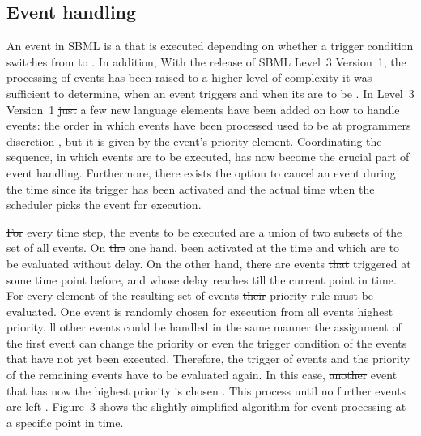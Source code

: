 \documentclass[10pt]{bmc_article}
\newenvironment{bmcformat}{\begin{raggedright}\baselineskip20pt\sloppy\setboolean{publ}{false}}{\end{raggedright}\baselineskip20pt\sloppy}
\begin{document}
\begin{bmcformat}
\subsection*{Event handling}

An event in \acs{SBML} is a  that is executed depending
on whether a trigger  condition switches from \false to \true.
In addition, 
With the release of \acs{SBML} Level~3 Version~1, the processing of events has
been raised to a higher level of complexity\COR{:}
 it was sufficient to determine, when an event triggers
and when its  are to be .
In Level~3 Version~1 \sout{just} a few new language elements have been
added on how to handle events:
 the order\COR{,} in which events have been processed\COR{,}
used to be at programmers discretion ,
but  it is given by the event's priority element.
Coordinating the sequence, in which events are to be executed, has now become
the crucial part of event handling. 
Furthermore, there exists the option to cancel an event during the time since
its trigger has been activated and the actual time when the scheduler picks the
event for execution.

\sout{For} every time step, the events to be executed are a union of two
subsets of the set of all events.
On \sout{the} one hand,  been
activated at the  time and which are to be evaluated without delay.
On the other hand, there are events \sout{that} triggered at some time point
before, and whose delay reaches till the current point in time.
For every element of the resulting set of events\sout{ their}
priority rule must be evaluated.
One event is randomly chosen for execution from all events  highest
priority.
ll other events could be \sout{handled} in
the same manner
the assignment of the first event can change the priority or even the trigger
condition of the events that have not yet been executed.
Therefore, the trigger of  events and the priority of the
remaining events have to be evaluated again.
In this case, \sout{another} event that has now the highest priority is
chosen .
This process  until no further events are left
.
Figure~3 shows the slightly simplified algorithm for event processing at a
specific point in time.


\end{bmcformat}
\end{document}
